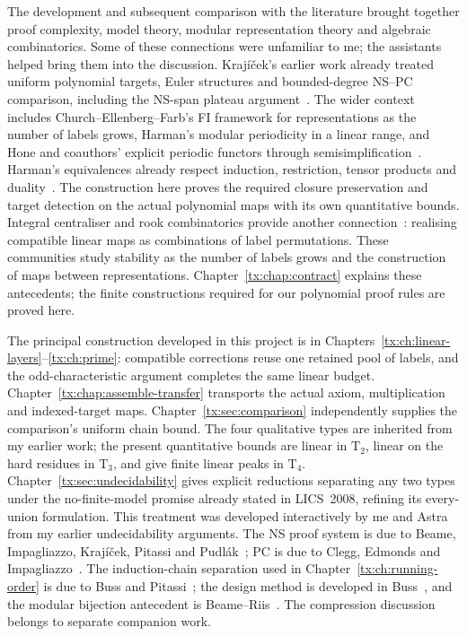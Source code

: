 \documentclass[11pt,a4paper,oneside,openany]{book}
\theoremstyle{definition}\newtheorem{definition}[theorem]{Definition}
\theoremstyle{remark}\newtheorem{remark}[theorem]{Remark}
\numberwithin{equation}{chapter}
\begin{document}
\newpage
The development and subsequent comparison with the literature brought
together proof complexity, model theory, modular representation theory
and algebraic combinatorics. Some of these connections were unfamiliar
to me; the assistants helped bring them into the discussion.
Kraj\'i\v cek's earlier work already treated uniform polynomial targets,
Euler structures and bounded-degree NS--PC comparison, including the
NS-span plateau argument~\cite{KrajEuler}\cite[Theorem~5.5]{Krajicek}. The wider context
includes Church--Ellenberg--Farb's FI framework for representations as
the number of labels grows, Harman's modular periodicity in a linear
range, and Hone and coauthors' explicit periodic functors through
semisimplification~\cite{CEF,Harman,HKPSYZ}. Harman's equivalences
already respect induction, restriction, tensor products and
duality~\cite[Propositions~2.7 and~2.12]{Harman}. The construction
here proves the required closure preservation and target detection
on the actual polynomial maps with its own quantitative bounds.
Integral centraliser and
rook combinatorics provide another connection~\cite{BDM}: realising
compatible linear maps as combinations of label permutations. These
communities study stability as the number of labels grows and the
construction of maps between representations.
Chapter~\ref{tx:chap:contract} explains these antecedents; the finite
constructions required for our polynomial proof rules are proved here.

The principal construction developed in this project is in
Chapters~\ref{tx:ch:linear-layers}--\ref{tx:ch:prime}: compatible
corrections reuse one retained pool of labels, and the odd-characteristic
argument completes the same linear budget.
Chapter~\ref{tx:chap:assemble-transfer} transports the actual axiom,
multiplication and indexed-target maps.
Chapter~\ref{tx:sec:comparison} independently supplies the comparison's
uniform chain bound. The four qualitative types are inherited from my
earlier work; the present quantitative bounds are linear in
$\mathrm T_2$, linear on the hard residues in $\mathrm T_3$, and give
finite linear peaks in $\mathrm T_4$.
Chapter~\ref{tx:sec:undecidability} gives explicit reductions separating
any two types under the no-finite-model promise already stated in
LICS~2008, refining its every-union formulation. This treatment was
developed interactively by me and Astra from my earlier undecidability
arguments. The NS proof system is due to Beame, Impagliazzo,
Kraj\'i\v cek, Pitassi and Pudl\'ak~\cite{NSFoundations}; PC is due
to Clegg, Edmonds and Impagliazzo~\cite{PCFoundations}.
The induction-chain separation used in
Chapter~\ref{tx:ch:running-order} is due to Buss and
Pitassi~\cite{BussPitassiInduction}; the design method is developed
in Buss~\cite{BussDesign}, and the modular bijection antecedent is
Beame--Riis~\cite{BeameRiis}. The compression discussion belongs to
separate companion work.
\end{document}
